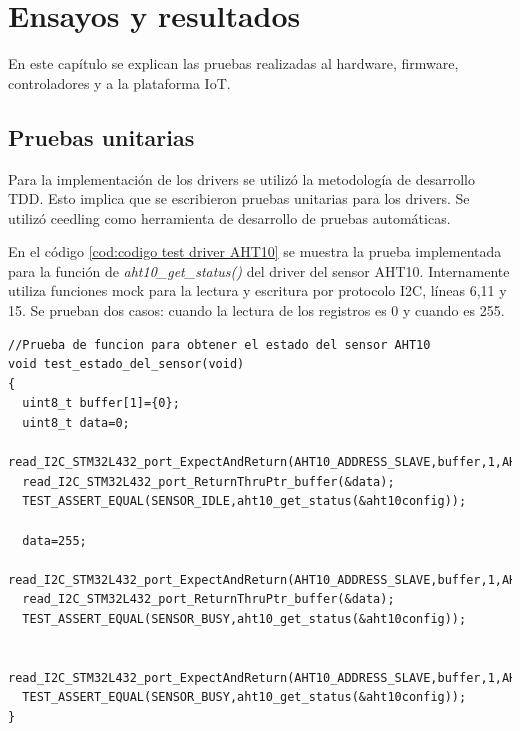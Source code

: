 
\chapter{Ensayos y resultados} %
En este capítulo se explican las pruebas realizadas al hardware, firmware, controladores y a la plataforma IoT.
\label{Chapter4} %


\section{Pruebas unitarias}
Para la implementación de los drivers se utilizó la metodología de desarrollo TDD. Esto implica que se escribieron pruebas unitarias para los drivers. Se utilizó ceedling como herramienta de desarrollo de pruebas automáticas.

En el código \ref{cod:codigo test driver AHT10} se muestra la prueba implementada para la función de \emph{aht10\_get\_status()} del driver del sensor AHT10. Internamente utiliza funciones mock para la lectura y escritura por protocolo I2C, líneas 6,11 y 15. Se prueban dos casos: cuando la lectura de los registros es 0 y cuando es 255.
\begin{lstlisting}[label=cod:codigo test driver AHT10,caption=Tests del driver del sensor AHT10.]
//Prueba de funcion para obtener el estado del sensor AHT10
void test_estado_del_sensor(void)
{
  uint8_t buffer[1]={0};
  uint8_t data=0;
  read_I2C_STM32L432_port_ExpectAndReturn(AHT10_ADDRESS_SLAVE,buffer,1,AHT10_OK);
  read_I2C_STM32L432_port_ReturnThruPtr_buffer(&data);
  TEST_ASSERT_EQUAL(SENSOR_IDLE,aht10_get_status(&aht10config));
  
  data=255;
  read_I2C_STM32L432_port_ExpectAndReturn(AHT10_ADDRESS_SLAVE,buffer,1,AHT10_OK);
  read_I2C_STM32L432_port_ReturnThruPtr_buffer(&data);
  TEST_ASSERT_EQUAL(SENSOR_BUSY,aht10_get_status(&aht10config));
  
  read_I2C_STM32L432_port_ExpectAndReturn(AHT10_ADDRESS_SLAVE,buffer,1,AHT10_ERROR);
  TEST_ASSERT_EQUAL(SENSOR_BUSY,aht10_get_status(&aht10config)); 
}
\end{lstlisting}

